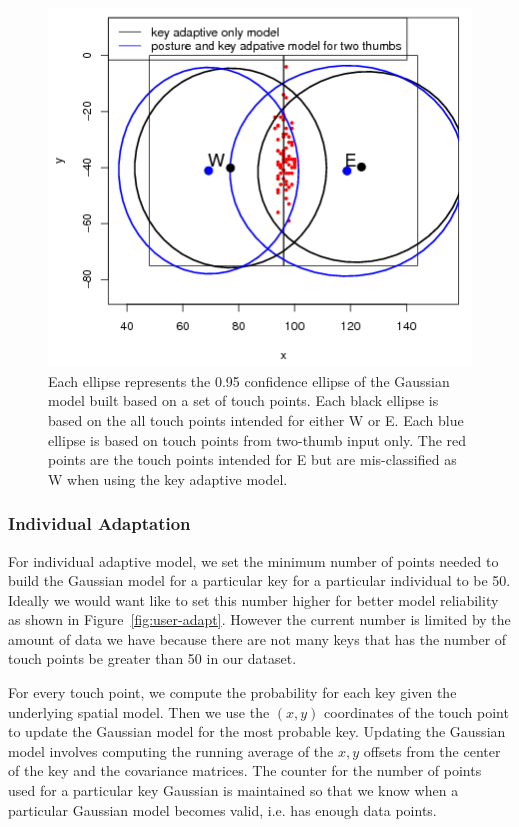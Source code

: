 \documentclass{sigchi}
\begin{document}
\begin{figure}[tb]
  \centering
  \includegraphics[width=1\columnwidth]{figures/key-posture-ellipse.png}
  \caption{Each ellipse represents the 0.95 confidence ellipse of the Gaussian model built based on a set of touch points. Each black ellipse is based on the all touch points intended for either W or E. Each blue ellipse is based on touch points from two-thumb input only. The red points are the touch points intended for E but are mis-classified as W when using the key adaptive model. 
}
  \label{fig:e-w-ellipses}
\end{figure}

\subsubsection{Individual Adaptation}
For individual adaptive model, we set the minimum number of points needed to build the
Gaussian model for a particular key for a particular individual to be 50. Ideally we would want like to set this number higher for better model reliability as shown in Figure~\ref{fig:user-adapt}. However the current number is 
limited by the amount of data we have because there are not many keys that has 
the number of touch points be greater than 50 in our dataset. 

For every touch point, we compute the probability for each key given the underlying spatial model. Then we use the $(x, y)$ coordinates of the touch point to update the Gaussian model
for the most probable key. Updating the Gaussian model involves computing the running
average of the $x, y$ offsets from the center of the key and the covariance matrices. The counter for the number of points used for a particular key Gaussian is maintained so that we
know when a particular Gaussian model becomes valid, i.e. has enough data points.
\end{document}
